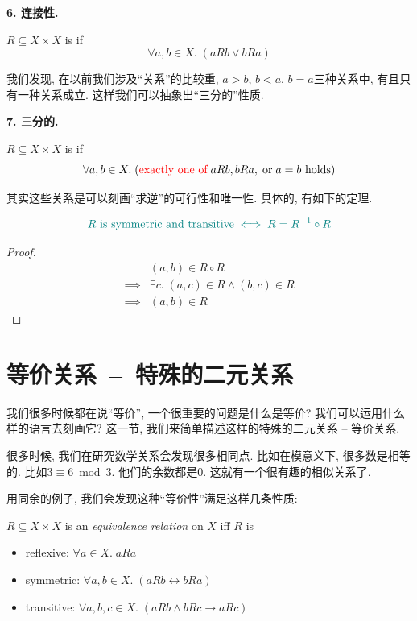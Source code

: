 \textbf{6. 连接性.}

\begin{definition}
  $R \subseteq X \times X$ is  if
  \[
    \forall a, b \in X.\; (a R b \lor b R a)
  \]
\end{definition}

我们发现, 在以前我们涉及``关系''的比较重, $a>b$, $b<a$, $b=a$三种关系中, 有且只有一种关系成立. 这样我们可以抽象出``三分的''性质.  

\textbf{7. 三分的.}

\begin{definition}
  $R \subseteq X \times X$ is  if
  \[
    \forall a, b \in X.\;
      (\text{\textcolor{red}{exactly one of}}\; a R b, b R a, \;\text{or}\; a = b \text{ holds})
  \]
\end{definition}

其实这些关系是可以刻画``求逆''的可行性和唯一性. 具体的, 有如下的定理.

\begin{theorem}
  \[
    \textcolor{teal}{R \text{ is symmetric and transitive} \iff R = R^{-1} \circ R}
  \]
\end{theorem}

\begin{proof}
  \setcounter{equation}{0}
  \begin{align*}
    &(a, b) \in R \circ R \\
    \implies& \exists c.\; (a, c) \in R \land (b, c) \in R \\
    \implies& (a, b) \in R
  \end{align*}
\end{proof}

\section{等价关系~--~特殊的二元关系}

我们很多时候都在说``等价'', 一个很重要的问题是什么是等价? 我们可以运用什么样的语言去刻画它? 这一节, 我们来简单描述这样的特殊的二元关系 -- 等价关系.

很多时候, 我们在研究数学关系会发现很多相同点. 比如在模意义下, 很多数是相等的. 比如$3 \equiv 6 \bmod 3$. 他们的余数都是$0$. 这就有一个很有趣的相似关系了. 

用同余的例子, 我们会发现这种``等价性''满足这样几条性质: 

\begin{definition}
  $R \subseteq X \times X$ is an {\it equivalence relation} on $X$ iff $R$ is
  \begin{itemize}
    \item reflexive: $\forall a \in X.\; a R a$
    \item symmetric: $\forall a, b \in X.\; (a R b \leftrightarrow b R a)$
    \item transitive: $\forall a, b, c \in X.\; (a R b \land b R c \to a R c)$
  \end{itemize}
\end{definition}

